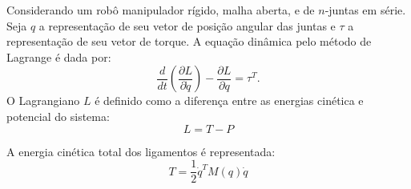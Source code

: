 Considerando um robô manipulador rígido, malha aberta, e de $n$-juntas em série. Seja $q$ a representação de seu vetor de posição angular das juntas  e $\tau$ a representação de seu vetor de torque. A equação dinâmica pelo método de
Lagrange é dada por:
\begin{equation} \label{eq:lagr1}
\frac{d}{dt} \left( \frac{\partial L}{\partial \dot{q}} \right) -\frac{\partial L}{\partial q}=\tau^{T}.
\end{equation}
O Lagrangiano $L$ é definido como a diferença entre as energias cinética e potencial do sistema:
\begin{equation} \label{L}
L=T-P
\end{equation}

A energia cinética total dos ligamentos é representada:
\begin{equation} \label{energT}
T=\frac{1}{2}\dot{q}^{T}M(q)\dot{q}
\end{equation}
